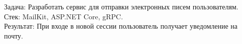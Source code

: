 \item {}
    Задача: Разработать сервис для отправки электронных писем пользователям.\\
    Стек: MailKit, ASP.NET Core, gRPC.\\
    Результат: При входе в новой сессии пользователь получает уведомление на почту.
